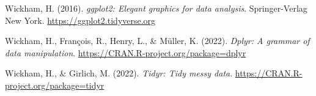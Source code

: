 \documentclass[
  man]{apa7}
\newlength{\cslhangindent}
\newlength{\cslentryspacingunit} %
\newenvironment{CSLReferences}[2] %
 {%
  \setlength{\parindent}{0pt}
  \ifodd #1
  \let\oldpar\par
  \def\par{\hangindent=\cslhangindent\oldpar}
  \fi
  \setlength{\parskip}{#2\cslentryspacingunit}
 }%
 {}
\begin{document}
\begin{CSLReferences}{1}{0}
\leavevmode{}%
Wickham, H. (2016). \emph{ggplot2: Elegant graphics for data analysis}. Springer-Verlag New York. \url{https://ggplot2.tidyverse.org}

\leavevmode{}%
Wickham, H., François, R., Henry, L., \& Müller, K. (2022). \emph{Dplyr: A grammar of data manipulation}. \url{https://CRAN.R-project.org/package=dplyr}

\leavevmode{}%
Wickham, H., \& Girlich, M. (2022). \emph{Tidyr: Tidy messy data}. \url{https://CRAN.R-project.org/package=tidyr}

\end{CSLReferences}
\end{document}
